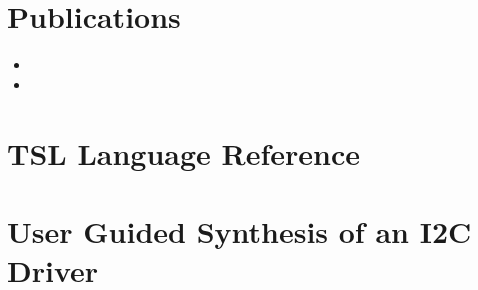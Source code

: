 \documentclass[a4paper,twoside,openright,11pt,oldfontcommands]{memoir}
\theoremstyle{definition}
\begin{document}
\tableofcontents
\clearpage

\listoffigures

\listoftables

\chapter{Publications}
\begin{itemize}
    \item {}
    \item {}
\end{itemize}

\mainmatter











\appendix
\chapter{TSL Language Reference}
\label{ch:tsl_ref}



\chapter{User Guided Synthesis of an I2C Driver}



\backmatter
\cleardoublepage


\end{document}
